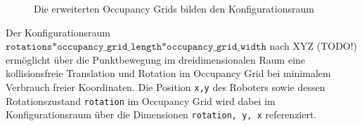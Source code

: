 \begin{figure}[H]
	\centering
	\footnotesize
	\centerline{}
	\caption{Die erweiterten Occupancy Grids bilden den Konfigurationsraum}
\end{figure}

Der Konfigurationsraum $\texttt{rotations*occupancy\_grid\_length*occupancy\_grid\_width}$ nach XYZ (TODO!) ermöglicht über die Punktbewegung im dreidimensionalen Raum eine kollisionsfreie Translation und Rotation im Occupancy Grid bei minimalem Verbrauch freier Koordinaten. 
Die Position \texttt{x,y} des Roboters sowie dessen Rotationszustand \texttt{rotation} im Occupancy Grid wird dabei im Konfigurationsraum über die Dimensionen \texttt{rotation, y, x} referenziert.


